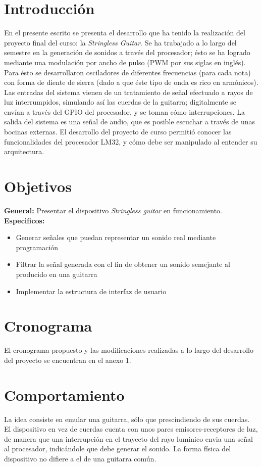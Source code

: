 \documentclass[12pt,journal]{IEEEtran}
\begin{document}
\section{Introducci\'on}
En el presente escrito se presenta el desarrollo que ha tenido la realizaci\'on del proyecto final del curso: la \emph{Stringless Guitar}. Se ha trabajado a lo largo del semestre en la generaci\'on de sonidos a trav\'es del procesador; \'esto se ha logrado mediante una modulaci\'on por ancho de pulso (PWM por sus siglas en ingl\'es). Para \'esto se desarrollaron osciladores de diferentes frecuencias (para cada nota) con forma de diente de sierra (dado a que \'este tipo de onda es rico en arm\'onicos). Las entradas del sistema vienen de un tratamiento de se\~nal efectuado a rayos de luz interrumpidos, simulando as\'i las cuerdas de la guitarra; digitalmente se env\'ian a trav\'es del GPIO del procesador, y se toman c\'omo interrupciones. La salida del sistema es una se\~nal de audio, que es posible escuchar a trav\'es de unas bocinas externas. El desarrollo del proyecto de curso permiti\'o conocer las funcionalidades del procesador LM32, y c\'omo debe ser manipulado al entender su arquitectura. 


\section{Objetivos}

\textbf{General:} Presentar el dispositivo \emph{Stringless guitar} en funcionamiento.\\
\textbf{Especificos:}
\begin{itemize}
	\item{Generar se\~nales que puedan representar un sonido real mediante programaci\'on}
	\item{Filtrar la se\~nal generada con el fin de obtener un sonido semejante al producido en una guitarra}
	\item{Implementar la estructura de interfaz de usuario}
 \end{itemize}

\section{Cronograma}
El cronograma propuesto y las modificaciones realizadas a lo largo del desarrollo del proyecto se encuentran en el anexo 1.

\section{Comportamiento}
La idea consiste en emular una guitarra, s\'olo que prescindiendo de sus cuerdas. El dispositivo en vez de cuerdas cuenta con unos pares emisores-receptores de luz, de manera que una interrupci\'on en el trayecto del rayo lum\'inico envia una se\~nal al procesador, indic\'andole que debe generar el sonido. 
La forma f\'isica del dispositivo no difiere a el de una guitarra com\'un.
\end{document}
